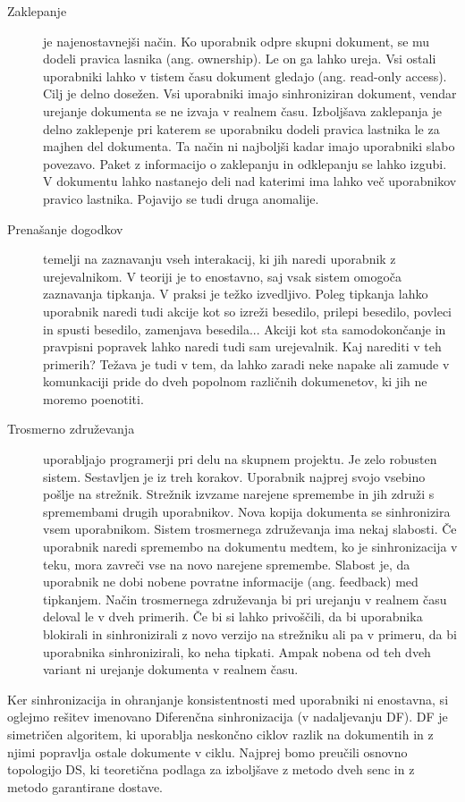 \documentclass[a4paper, 12pt, twoside]{book}
\begin{document}
\begin{description}
	\item[Zaklepanje] je najenostavnejši način. Ko uporabnik odpre skupni dokument, se mu dodeli pravica lasnika (ang. ownership). Le on ga lahko ureja. Vsi ostali uporabniki lahko v tistem času dokument gledajo (ang. read-only access). Cilj je delno dosežen. Vsi uporabniki imajo sinhroniziran dokument, vendar urejanje dokumenta se ne izvaja v realnem času. Izboljšava zaklepanja je delno zaklepenje pri katerem se uporabniku dodeli pravica lastnika le za majhen del dokumenta. Ta način ni najboljši kadar imajo uporabniki slabo povezavo. Paket z informacijo o zaklepanju in odklepanju se lahko izgubi. V dokumentu lahko nastanejo deli nad katerimi ima lahko več uporabnikov pravico lastnika. Pojavijo se tudi druga anomalije.
	\item[Prenašanje dogodkov] temelji na zaznavanju vseh interakacij, ki jih naredi uporabnik z urejevalnikom. V teoriji je to enostavno, saj vsak sistem omogoča zaznavanja tipkanja. V praksi je težko izvedljivo. Poleg tipkanja lahko uporabnik naredi tudi akcije kot so izreži besedilo, prilepi besedilo, povleci in spusti besedilo, zamenjava besedila... Akciji kot sta samodokončanje in pravpisni popravek lahko naredi tudi sam urejevalnik. Kaj narediti v teh primerih? Težava je tudi v tem, da lahko zaradi neke napake ali zamude v komunkaciji pride do dveh popolnom različnih dokumenetov, ki jih ne moremo poenotiti.
	\item[Trosmerno združevanja] uporabljajo programerji pri delu na skupnem projektu. Je zelo robusten sistem. Sestavljen je iz treh korakov. Uporabnik najprej svojo vsebino pošlje na strežnik. Strežnik izvzame narejene spremembe in jih združi s spremembami drugih uporabnikov. Nova kopija dokumenta se sinhronizira vsem uporabnikom. Sistem trosmernega združevanja ima nekaj slabosti. Če uporabnik naredi spremembo na dokumentu medtem, ko je sinhronizacija v teku, mora zavreči vse na novo narejene spremembe. Slabost je, da uporabnik ne dobi nobene povratne informacije (ang. feedback) med tipkanjem. Način trosmernega združevanja bi pri urejanju v realnem času deloval le v dveh primerih. Če bi si lahko privoščili, da bi uporabnika blokirali in sinhronizirali z novo verzijo na strežniku ali pa v primeru, da bi uporabnika sinhronizirali, ko neha tipkati. Ampak nobena od teh dveh variant ni urejanje dokumenta v realnem času.
\end{description}

Ker sinhronizacija in ohranjanje konsistentnosti med uporabniki ni enostavna, si oglejmo rešitev imenovano Diferenčna sinhronizacija (v nadaljevanju DF). DF je simetričen algoritem, ki uporablja neskončno ciklov razlik na dokumentih in z njimi popravlja ostale dokumente v ciklu. Najprej bomo preučili osnovno topologijo DS, ki teoretična podlaga za izboljšave z metodo dveh senc in z metodo garantirane dostave.
\end{document}
